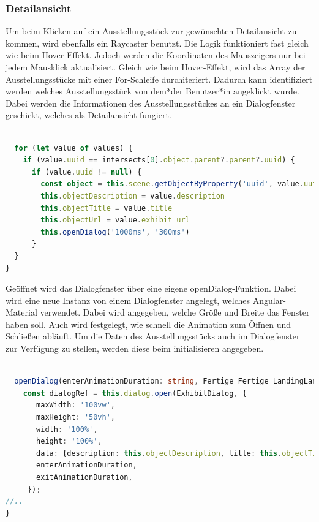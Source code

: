 \subsubsection{Detailansicht}

Um beim Klicken auf ein Ausstellungsstück zur gewünschten Detailansicht zu kommen, wird ebenfalls ein Raycaster benutzt. Die Logik funktioniert fast gleich wie beim Hover-Effekt. Jedoch werden die Koordinaten des Mauszeigers nur bei jedem Mausklick aktualisiert. Gleich wie beim Hover-Effekt, wird das Array der Ausstellungsstücke mit einer For-Schleife durchiteriert. Dadurch kann identifiziert werden welches Ausstellungsstück von dem*der Benutzer*in angeklickt wurde. Dabei werden die Informationen des Ausstellungsstückes an ein Dialogfenster geschickt, welches als Detailansicht fungiert.  

\begin{lstlisting}[caption={identifizieren des geklickten Ausstellungsstückes},language=TypeScript]
    
  for (let value of values) {
    if (value.uuid == intersects[0].object.parent?.parent?.uuid) {
      if (value.uuid != null) {
        const object = this.scene.getObjectByProperty('uuid', value.uuid);
        this.objectDescription = value.description
        this.objectTitle = value.title
        this.objectUrl = value.exhibit_url
        this.openDialog('1000ms', '300ms')
      }
  }
}

\end{lstlisting}

Geöffnet wird das Dialogfenster über eine eigene openDialog-Funktion. Dabei wird eine neue Instanz von einem Dialogfenster angelegt, welches Angular-Material verwendet. Dabei wird angegeben, welche Größe und Breite das Fenster haben soll. Auch wird festgelegt, wie schnell die Animation zum Öffnen und Schließen abläuft. Um die Daten des Ausstellungsstücks auch im Dialogfenster zur Verfügung zu stellen, werden diese beim initialisieren angegeben.

\begin{lstlisting}[caption={initialisieren des Dialogfensters},language=TypeScript]
    
  openDialog(enterAnimationDuration: string, Fertige Fertige LandingLandingexitAnimationDuration: string): void {
    const dialogRef = this.dialog.open(ExhibitDialog, {
       maxWidth: '100vw',
       maxHeight: '50vh',
       width: '100%',
       height: '100%',
       data: {description: this.objectDescription, title: this.objectTitle, objectUrl: this.objectUrl},
       enterAnimationDuration,
       exitAnimationDuration,
     });
//..
}
\end{lstlisting}

